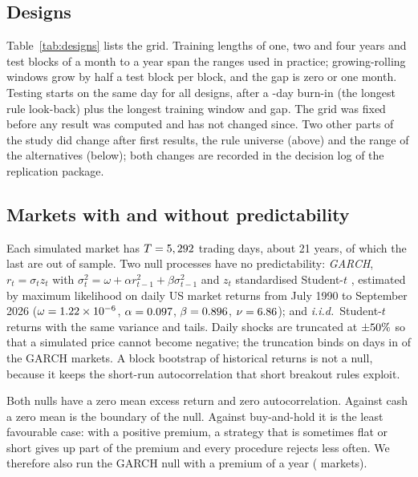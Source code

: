\documentclass[pdflatex,sn-basic]{sn-jnl}
\theoremstyle{thmstyleone}
\theoremstyle{thmstylethree}
\newcommand{\tabpath}{../tables/tex}
\begin{document}
\subsection{Designs}

\begin{table}[tbp]
\caption{The 56 walk-forward designs: four test-block lengths, two gaps and seven training-window
settings.}
\label{tab:designs}
\setlength{\tabcolsep}{1.5pt}
\end{table}

Table~\ref{tab:designs} lists the grid. Training lengths of one, two and four years and test blocks of a
month to a year span the ranges used in practice; growing-rolling windows grow by half a test block per
block, and the gap is zero or one month. Testing starts on the same day for all designs, after a
\NumBurnIn-day burn-in (the longest rule look-back) plus the longest training window and gap. The grid
was fixed before any result was computed and has not changed since. Two other parts of the study did
change after first results, the rule universe (above) and the range of the alternatives (below); both
changes are recorded in the decision log of the replication package.

\subsection{Markets with and without predictability}

Each simulated market has $T=5,292$ trading days, about 21 years, of which the last \NumNoos{} are out of
sample. Two null processes have no predictability: \emph{GARCH}, $r_t=\sigma_t z_t$ with
$\sigma^2_t=\omega+\alpha r^2_{t-1}+\beta\sigma^2_{t-1}$ and $z_t$ standardised Student-$t$
\citep{engle1982,bollerslev1986,bollerslev1987}, estimated by maximum likelihood on daily US market
returns from July 1990 to September 2026 ($\omega=1.22\times10^{-6}$, $\alpha=0.097$,
$\beta=0.896$, $\nu=6.86$); and \emph{i.i.d.}\ Student-$t$ returns with the same variance
and tails. Daily shocks are truncated at $\pm50\%$ so that a simulated price cannot become
negative; the truncation binds on \NumCappedDays{} days in \NumCappedReps{} of the \NumNullReps{} GARCH
markets. A block bootstrap of historical returns is not a null, because it keeps the short-run
autocorrelation that short breakout rules exploit.

Both nulls have a zero mean excess return and zero autocorrelation. Against cash a zero mean is the
boundary of the null. Against buy-and-hold it is the least favourable case: with a positive premium, a
strategy that is sometimes flat or short gives up part of the premium and every procedure rejects less
often. We therefore also run the GARCH null with a premium of \NumPremium{} a year
(\NumPremiumReps{} markets).
\end{document}
